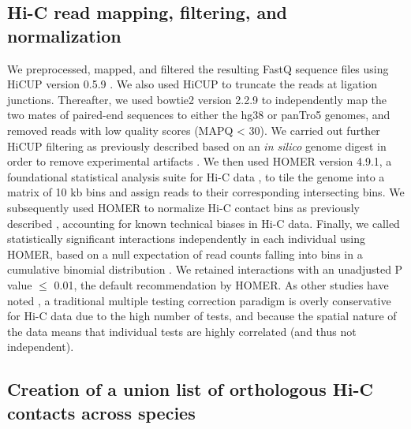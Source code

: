 \subsection{Hi-C read mapping, filtering, and normalization}

We preprocessed, mapped, and filtered the resulting FastQ sequence files using HiCUP version 0.5.9 \cite{Wingett.2015}. We also used HiCUP to truncate the reads at ligation junctions. Thereafter, we used bowtie2 version 2.2.9 \cite{Langmead.2012} to independently map the two mates of paired-end sequences to either the hg38 or panTro5 genomes, and removed reads with low quality scores (MAPQ {\textless} 30). We carried out further HiCUP filtering as previously described based on an \textit{in silico} genome digest in order to remove experimental artifacts \cite{Wingett.2015}. We then used HOMER version 4.9.1, a foundational statistical analysis suite for Hi-C data \cite{Heinz.2010}, to tile the genome into a matrix of 10 kb bins and assign reads to their corresponding intersecting bins. We subsequently used HOMER to normalize Hi-C contact bins as previously described \cite{Heinz.2010}, accounting for known technical biases in Hi-C data. Finally, we called statistically significant interactions independently in each individual using HOMER, based on a null expectation of read counts falling into bins in a cumulative binomial distribution \cite{Heinz.2010}. We retained interactions with an unadjusted P value ${\leq}$ 0.01, the default recommendation by HOMER. As other studies have noted \cite{Durand.2016}, a traditional multiple testing correction paradigm is overly conservative for Hi-C data due to the high number of tests, and because the spatial nature of the data means that individual tests are highly correlated (and thus not independent).

\subsection{Creation of a union list of orthologous Hi-C contacts across species}

